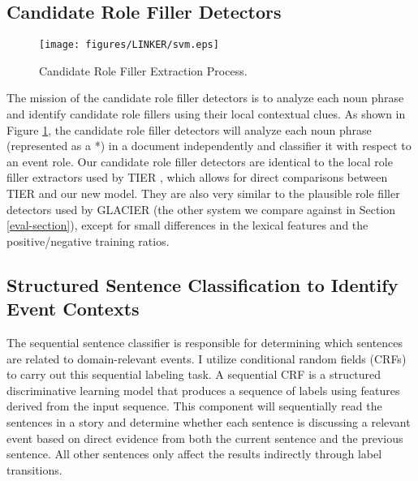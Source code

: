\subsection{Candidate Role Filler Detectors}
  \begin{figure}[h]
 \centering
 \texttt{[image: figures/LINKER/svm.eps]}
 \caption{Candidate Role Filler Extraction Process.}
\label{svm}
\end{figure} 
The mission of the candidate role filler detectors is to analyze each 
noun phrase and identify candidate role fillers using 
their local contextual clues. 
As shown in Figure \ref{svm}, the candidate role filler detectors will 
analyze each noun phrase (represented as a *) in a document 
independently and classifier it 
with respect to an event role. 
Our candidate role filler detectors are identical to the local role
filler extractors used by TIER \cite{HuangR11}, which allows for
direct comparisons between TIER and our new model.  They are also very
similar to the plausible role filler detectors used by GLACIER
\cite{patwardhan-emnlp09} (the other system we compare against
in Section \ref{eval-section}), except for small differences in the
lexical features and the positive/negative training ratios.

\subsection{Structured Sentence Classification to Identify Event Contexts}
The sequential sentence classifier is responsible for determining
which sentences are related to domain-relevant events.  I utilize
conditional random fields (CRFs) \cite{CRFs01} to carry out this
sequential labeling task.  A sequential CRF is a
structured discriminative learning model that produces a sequence of
labels using features derived from the input sequence.   This component
will sequentially read the sentences in a story and determine whether
each sentence is discussing a relevant event based on direct evidence from both the current 
sentence and the previous sentence.
All other sentences only affect the results indirectly through label transitions. 

